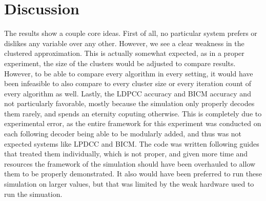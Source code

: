 \documentclass[conference]{IEEEtran}
\begin{document}
\section{Discussion}
The results show a couple core ideas. First of all, no particular system prefers or dislikes any variable over any other. However, we see a clear weakness in the clustered approximation. This is actually somewhat expected, as in a proper experiment, the size of the clusters would be adjusted to compare results. However, to be able to compare every algorithm in every setting, it would have been infeasible to also compare to every cluster size or every iteration count of every algorithm as well. Lastly, the LDPCC accuracy and BICM accuracy and not particularly favorable, mostly because the simulation only properly decodes them rarely, and spends an eternity coputing otherwise. This is completely due to experimental error, as the entire framework for this experiment was conducted on each following decoder being able to be modularly added, and thus was not expected systems like LPDCC and BICM. The code was written following guides that treated them individually, which is not proper, and given more time and resources the framework of the simulation should have been overhauled to allow them to be properly demonstrated. It also would have been preferred to run these simulation on larger values, but that was limited by the weak hardware used to run the simuation.
\end{document}
